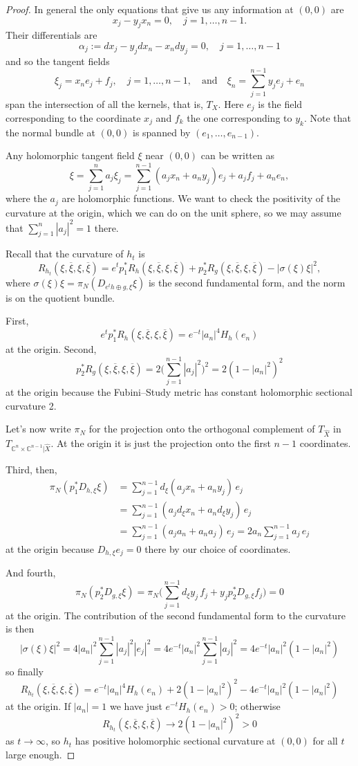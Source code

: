 \documentclass[10pt,a4paper]{amsart}
\newcommand{\kk}[1]{\mathbb{#1}}
\def\qandq{\quad\text{and}\quad}
\def\ov#1{\overline{#1}}
\def\hsc{holomorphic sectional curvature}
\def\bl#1{\widehat{#1}}
\def\blX{\bl{X}}
\begin{document}
\begin{proof}
In general the only equations that give us any information at $(0,0)$ are
$$
x_j - y_j x_n = 0, \quad j = 1, \ldots, n-1.
$$
Their differentials are
$$
\alpha_j := dx_j - y_j dx_n - x_n dy_j = 0, \quad j=1,\ldots,n-1
$$
and so the tangent fields
$$
\xi_j = x_n e_j + f_j,
\quad j=1,\ldots,n-1,
\qandq
\xi_n = \sum_{j=1}^{n-1} y_j e_j + e_n
$$
span the intersection of all the kernels, that is, $T_X$.
Here $e_j$ is the field corresponding to the coordinate $x_j$
and $f_k$ the one corresponding to $y_k$.
Note that the normal bundle at $(0,0)$ is spanned by $(e_1, \ldots, e_{n-1})$.

Any holomorphic tangent field $\xi$ near $(0,0)$ can be written as
$$
\xi = \sum_{j=1}^n a_j \xi_j
= \sum_{j=1}^{n-1} (a_j x_n + a_n y_j) e_j + a_j f_j
+ a_n e_n,
$$
where the $a_j$ are holomorphic functions.
We want to check the positivity of the curvature at the origin, which we can do
on the unit sphere, so we may assume that $\sum_{j=1}^n |a_j|^2 = 1$ there.

Recall that the curvature of $h_t$ is
$$
R_{h_t}(\xi, \ov\xi, \xi, \ov\xi)
= e^t p_1^* R_h(\xi, \ov\xi, \xi, \ov\xi)
+ p_2^* R_g(\xi, \ov\xi, \xi, \ov\xi)
- |\sigma(\xi)\xi|^2,
$$
where $\sigma(\xi)\xi = \pi_N(D_{e^th \oplus g,\xi} \xi)$ is the second
fundamental form, and the norm is on the quotient bundle.

First,
$$
e^t p_1^*R_h(\xi, \ov\xi, \xi, \ov\xi)
= e^{-t} |a_n|^4 H_h(e_n)
$$
at the origin. Second,
$$
p_2^*R_g(\xi, \ov\xi, \xi, \ov\xi)
= 2 \biggl(\sum_{j=1}^{n-1} |a_j|^2\biggr)^2
= 2(1 - |a_n|^2)^2
$$
at the origin
because the Fubini--Study metric has constant \hsc{} 2.

Let's now write $\pi_N$ for the projection onto the orthogonal complement of
$T_{\blX}$ in $T_{\kk C^n \times \kk C^{n-1}|\blX}$.
At the origin it is just the projection onto the first $n-1$ coordinates.

Third, then,
\begin{align*}
\pi_N(p_1^*D_{h,\xi} \xi)
&= \sum_{j=1}^{n-1} d_{\xi}(a_j x_n + a_n y_j) \, e_j
\\
&= \sum_{j=1}^{n-1} (a_j d_{\xi}x_n + a_n d_{\xi} y_j) \, e_j
\\
&= \sum_{j=1}^{n-1} (a_j a_n + a_n a_j ) \, e_j
= 2 a_n \sum_{j=1}^{n-1} a_j \, e_j
\end{align*}
at the origin
because $D_{h,\xi} e_j = 0$ there by our choice of coordinates.

And fourth,
$$
\pi_N(p_2^*D_{g,\xi} \xi)
= \pi_N \biggl( \sum_{j=1}^{n-1} d_\xi y_j \, f_j + y_j p_2^*D_{g,\xi} f_j \biggr) = 0
$$
at the origin.
The contribution of the second fundamental form to the curvature is then
$$
|\sigma(\xi)\xi|^2
= 4 |a_n|^2 \sum_{j=1}^{n-1} |a_j|^2 |e_j|^2
= 4 e^{-t} |a_n|^2 \sum_{j=1}^{n-1} |a_j|^2
= 4 e^{-t} |a_n|^2(1 - |a_n|^2)
$$
so finally
$$
R_{h_t}(\xi, \ov\xi, \xi, \ov\xi)
= e^{-t} |a_n|^4 H_h(e_n)
+ 2(1 - |a_n|^2)^2
- 4 e^{-t} |a_n|^2(1 - |a_n|^2)
$$
at the origin.
If $|a_n| = 1$ we have just $e^{-t} H_h(e_n) > 0$;
otherwise
$$
R_{h_t}(\xi, \ov\xi, \xi, \ov\xi) \to 2(1 - |a_n|^2)^2 > 0
$$
as $t \to \infty$,
so $h_t$ has positive \hsc{} at $(0,0)$ for all $t$ large enough.
\end{proof}









\end{document}
